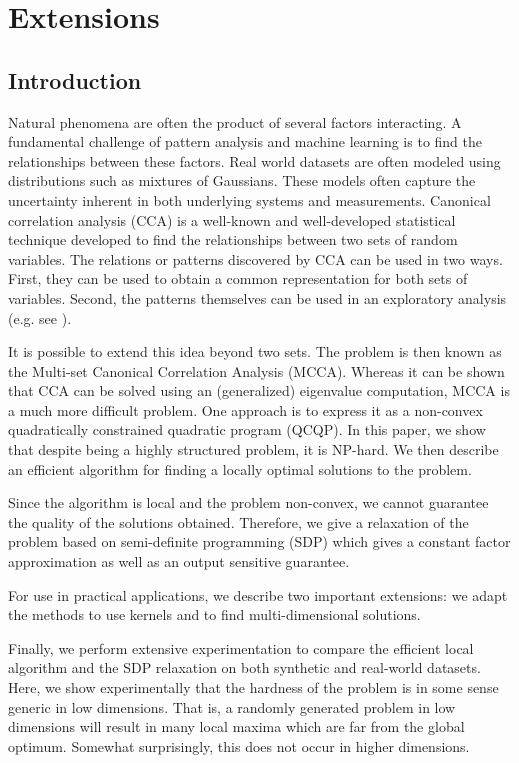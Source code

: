 %
\chapter{Extensions}


\section{Introduction}
Natural phenomena are often the product of several factors
interacting. A fundamental challenge of pattern analysis and
machine learning is to find the relationships between these
factors. Real world datasets are often modeled using
distributions such as mixtures of Gaussians.  These models often
capture the uncertainty inherent in both underlying systems and
measurements. Canonical correlation analysis (CCA) is a
well-known and well-developed statistical technique developed to find the
relationships between two sets of random variables.
The relations or patterns discovered by CCA can be used
in two ways. First, they can be used to obtain a common representation for both sets of variables.
Second, the patterns themselves can be used in an exploratory analysis (e.g. see \cite{Hardoon_usingimage}).

It is possible to extend this idea beyond two sets. The
problem is then known as the Multi-set Canonical Correlation Analysis
(MCCA). Whereas it can be shown that CCA can be solved using an
(generalized) eigenvalue computation, MCCA is a much more
difficult problem. One approach is to express it as a
non-convex quadratically constrained quadratic program (QCQP). In
this paper, we show that despite being a highly structured
problem, it is NP-hard. We then describe an efficient algorithm
for finding a locally optimal solutions to the problem.

Since the algorithm is local and the problem non-convex, we
cannot guarantee the quality of the solutions
obtained. Therefore, we give a relaxation of the problem based on
semi-definite programming (SDP) which gives a constant factor
approximation as well as an output sensitive guarantee.

For use in practical applications, we describe two important
extensions: we adapt the methods to use kernels and to find
multi-dimensional solutions.

Finally, we perform extensive experimentation to compare the
efficient local algorithm and the SDP relaxation on both
synthetic and real-world datasets. Here, we show experimentally
that the hardness of the problem is in some sense generic in low
dimensions. That is, a randomly generated problem in low
dimensions will result in many local maxima which are far from
the global optimum. Somewhat surprisingly, this does not occur in
higher dimensions.%

